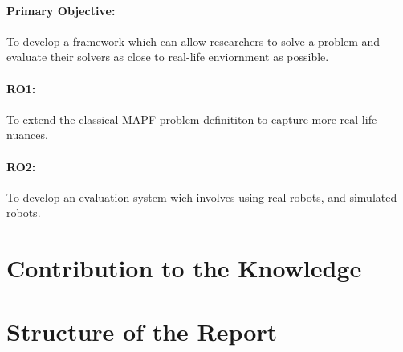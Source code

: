 \paragraph*{Primary Objective: } To develop a framework which can allow researchers to solve a problem and evaluate their solvers as close to real-life enviornment as possible.
\paragraph*{RO1:} To extend the classical MAPF problem definititon to capture more real life nuances.
\paragraph*{RO2:} To develop an evaluation system wich involves using real robots, and simulated robots.
\section{Contribution to the Knowledge}
\section{Structure of the Report}
